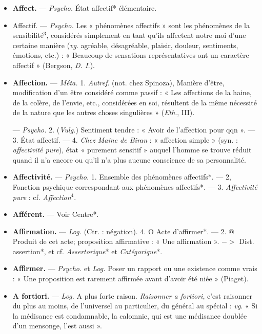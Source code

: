 \begin{itemize}[leftmargin=1cm, label=, itemsep=1pt]
\item {\bf Affect.} — \textsf{\textit {Psycho.}} État affectif*
élémentaire.

\item {\bf }Affectif. — \textsf{\textit {Psycho.}} Les « phénomènes
affectifs » sont les phénomènes de la
sensibilité$^3$, considérés simplement
en tant qu'ils affectent notre moi
d’une certaine manière ({\it vg}. agréable,
désagréable, plaisir, douleur, sentiments, émotions, etc.) : « Beaucoup
de sensations représentatives ont un
caractère affectif » (Bergson, {\it D. I.}).

\item {\bf Affection.} — \textsf{\textit {Méta.}} 1. {\it Autref}. (not.
chez Spinoza), Manière d’être, modification d’un être considéré comme
passif : « Les affections de la haine,
de la colère, de l’envie, etc., considérées en soi, résultent de la même
nécessité de la nature que les autres
choses singulières » ({\it Eth}., III).

— \textsf{\textit {Psycho.}} 2. (\textsf{\textit {Vulg.}}) Sentiment
tendre : « Avoir de l’affection pour
qqn ». — 3. État affectif. — 4. {\it Chez
Maine de Biran} : « affection simple »
(syn. : {\it affectivité pure}), état « purement sensitif » auquel l’homme se
trouve réduit quand il n’a encore ou
qu’il n’a plus aucune conscience de
sa personnalité.

\item {\bf Affectivité.} — \textsf{\textit {Psycho.}} 1. Ensemble
des phénomènes affectifs*. — 2,
Fonction psychique correspondant
aux phénomènes affectifs*. — 3.
{\it Affectivité pure} : cf. {\it Affection}$^4$.

\item {\bf Afférent.} — Voir Centre*.

\item {\bf Affirmation.} — \textsf{\textit {Log.}} (Ctr. : négation).
4. O Acte d’affirmer*. — 2. @ Produit de cet acte;
proposition affirmative : « Une affirmation ».
$->$ Dist. assertion*, et cf. {\it Assertorique}* et {\it Catégorique}*.

\item {\bf Affirmer.} — \textsf{\textit {Psycho.}} et \textsf{\textit {Log.}} Poser
un rapport ou une existence comme
vrais : « Une proposition est rarement
affirmée avant d'avoir été niée »
(Piaget).

\item {\bf A fortiori.} — \textsf{\textit {Log.}} A plus forte raison.
{\it Raisonner a fortiori}, c’est raisonner
du plus au moins, de l’universel au
particulier, du général au spécial :
{\it vg}. « Si la médisance est condamnable,
 la calomnie, qui est une médisance
doublée d’un mensonge, l’est aussi ».


\end{itemize}
